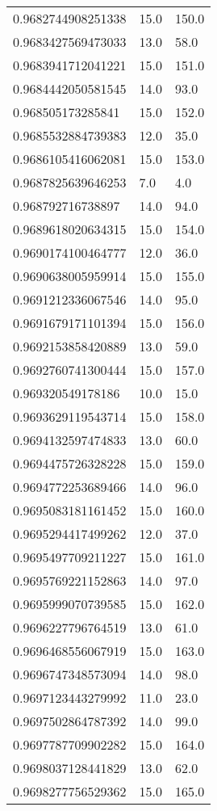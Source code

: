 \begin{center}
\begin{supertabular}[H]{p{0.30\textwidth}p{0.05\textwidth}p{0.05\textwidth}}
0.9682744908251338 & 15.0 & 150.0 \\ 
0.9683427569473033 & 13.0 & 58.0 \\ 
0.9683941712041221 & 15.0 & 151.0 \\ 
0.9684442050581545 & 14.0 & 93.0 \\ 
0.968505173285841 & 15.0 & 152.0 \\ 
0.9685532884739383 & 12.0 & 35.0 \\ 
0.9686105416062081 & 15.0 & 153.0 \\ 
0.9687825639646253 & 7.0 & 4.0 \\ 
0.968792716738897 & 14.0 & 94.0 \\ 
0.9689618020634315 & 15.0 & 154.0 \\ 
0.9690174100464777 & 12.0 & 36.0 \\ 
0.9690638005959914 & 15.0 & 155.0 \\ 
0.9691212336067546 & 14.0 & 95.0 \\ 
0.9691679171101394 & 15.0 & 156.0 \\ 
0.9692153858420889 & 13.0 & 59.0 \\ 
0.9692760741300444 & 15.0 & 157.0 \\ 
0.969320549178186 & 10.0 & 15.0 \\ 
0.9693629119543714 & 15.0 & 158.0 \\ 
0.9694132597474833 & 13.0 & 60.0 \\ 
0.9694475726328228 & 15.0 & 159.0 \\ 
0.9694772253689466 & 14.0 & 96.0 \\ 
0.9695083181161452 & 15.0 & 160.0 \\ 
0.9695294417499262 & 12.0 & 37.0 \\ 
0.9695497709211227 & 15.0 & 161.0 \\ 
0.9695769221152863 & 14.0 & 97.0 \\ 
0.9695999070739585 & 15.0 & 162.0 \\ 
0.9696227796764519 & 13.0 & 61.0 \\ 
0.9696468556067919 & 15.0 & 163.0 \\ 
0.9696747348573094 & 14.0 & 98.0 \\ 
0.9697123443279992 & 11.0 & 23.0 \\ 
0.9697502864787392 & 14.0 & 99.0 \\ 
0.9697787709902282 & 15.0 & 164.0 \\ 
0.9698037128441829 & 13.0 & 62.0 \\ 
0.9698277756529362 & 15.0 & 165.0 \\ 

\end{supertabular}
\end{center}
